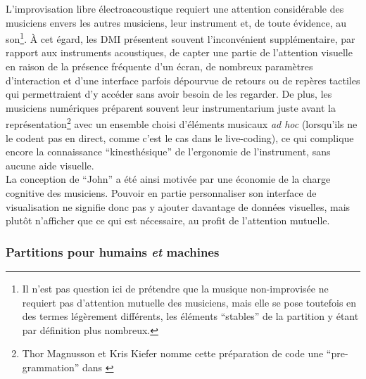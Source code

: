 \noindent L'improvisation libre électroacoustique requiert une attention considérable des musiciens envers les autres musiciens, leur instrument et, de toute évidence, au son\footnote{Il n'est pas question ici de prétendre que la musique non-improvisée ne requiert pas d'attention mutuelle des musiciens, mais elle se pose toutefois en des termes légèrement différents, les éléments ``stables'' de la partition y étant par définition plus nombreux.}. À cet égard, les \gls{DMI} présentent souvent l'inconvénient supplémentaire, par rapport aux instruments acoustiques, de capter une partie de l'attention visuelle en raison de la présence fréquente d'un écran, de nombreux paramètres d'interaction et d'une interface parfois dépourvue de retours ou de repères tactiles qui permettraient d'y accéder sans avoir besoin de les regarder. De plus, les musiciens numériques préparent souvent leur instrumentarium juste avant la représentation\footnote{Thor Magnusson et Kris Kiefer nomme cette préparation de code une ``pre-grammation'' dans \cite{kiefer_live_2019}} avec un ensemble choisi d'éléments musicaux \textit{ad hoc} (lorsqu'ils ne le codent pas en direct, comme c'est le cas dans le live-coding), ce qui complique encore la connaissance ``kinesthésique'' de l'ergonomie de l'instrument, sans aucune aide visuelle.\\
\indent La conception de ``John'' a été ainsi motivée par une économie de la charge cognitive des musiciens. Pouvoir en partie personnaliser son interface de visualisation ne signifie donc pas y ajouter davantage de données visuelles, mais plutôt n'afficher que ce qui est nécessaire, au profit de l'attention mutuelle.

\subsubsection{Partitions pour humains \emph{et} machines}
\label{sec:notation:score_for_humans_and_machines}

